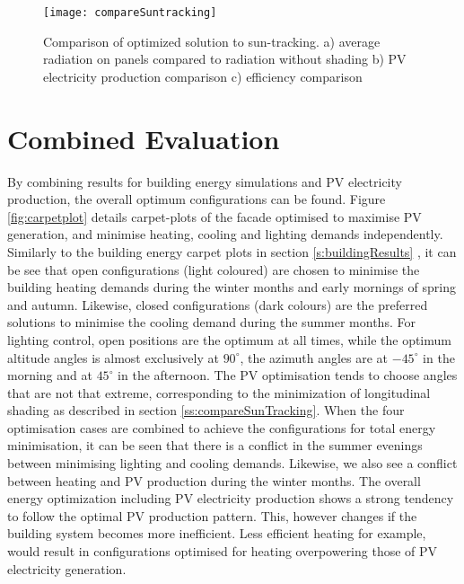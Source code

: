 		\begin{figure*}
			\begin{center}
			\texttt{[image: compareSuntracking]}
			\caption{Comparison of optimized solution to sun-tracking. a) average radiation on panels compared to radiation without shading b) PV electricity production comparison c) efficiency comparison}
			\label{f:compareSuntracking}
			\end{center}
		\end{figure*}




\section{Combined Evaluation}

	By combining results for building energy simulations and PV electricity production, the overall optimum configurations can be found. Figure \ref{fig:carpetplot} details carpet-plots of the facade optimised to maximise PV generation, and minimise heating, cooling and lighting demands independently. Similarly to the building energy carpet plots in section \ref{s:buildingResults} , it can be see that open configurations (light coloured) are chosen to minimise the building heating demands during the winter months and early mornings of spring and autumn. Likewise, closed configurations (dark colours) are the preferred solutions to minimise the cooling demand during the summer months. For lighting control, open positions are the optimum at all times, while the optimum altitude angles is almost exclusively at $90^{\circ}$, the azimuth angles are at $-45^{\circ}$ in the morning and at $45^{\circ}$  in the afternoon. The PV optimisation tends to choose angles that are not that extreme, corresponding to the minimization of longitudinal shading as described in section \ref{ss:compareSunTracking}. When the four optimisation cases are combined to achieve the configurations for total energy minimisation, it can be seen that there is a conflict in the summer evenings between minimising lighting and cooling demands. Likewise, we also see a conflict between heating and PV production during the winter months. The overall energy optimization including PV electricity production shows a strong tendency to follow the optimal PV production pattern. This, however changes if the building system becomes more inefficient. Less efficient heating for example, would result in configurations optimised for heating overpowering those of PV electricity generation.




